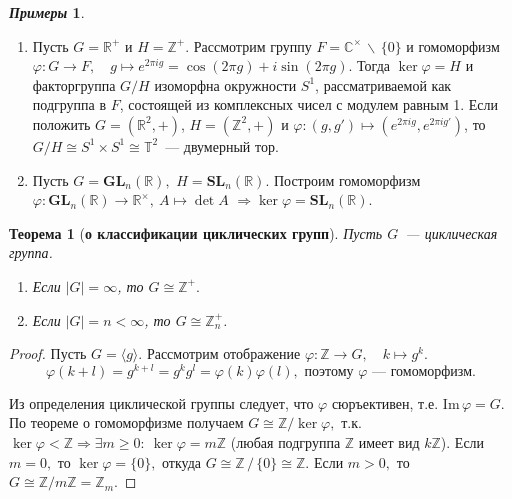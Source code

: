 \documentclass[a4paper, 14pt]{extarticle}
\newcommand{\n}{\par}
\newcommand{\integers}{\mathbb{Z}}
\newcommand{\real}{\mathbb{R}}
\newcommand{\complex}{\mathbb{C}}
\newcommand{\GL}{\mathbf{GL}}
\newcommand{\SL}{\mathbf{SL}}
\newcommand{\suchthat}{{:}{ } \ }
\newcommand{\im}{\mathrm{Im} \,}
\renewcommand{\phi}{\varphi}
\theoremstyle{definition}
\newtheorem*{exmpls}{\textit{Примеры}}
\theoremstyle{plain}
\newtheorem*{theorem*}{Теорема}
\numberwithin{theorem}{section}
\numberwithin{definition}{section}
\numberwithin{statement}{section}
\numberwithin{lemma}{section}
\numberwithin{consequence}{section}
\begin{document}
	\begin{exmpls}
        \
        \begin{enumerate}
            \setlength\itemsep{0.1em}
            \item Пусть ${G = \real ^ +}$ и ${H = \integers ^ +}$. Рассмотрим группу ${F = \complex^{\times} \, \backslash \, \{0\}}$ и гомоморфизм ${\phi: G \rightarrow F}, {\quad g \mapsto e^{2\pi i g} = \cos(2\pi g) + i \sin(2\pi g).}$
		Тогда ${\ker \phi = H}$ и факторгруппа $G/H$ изоморфна окружности $S^1$, рассматриваемой как подгруппа в $F$, состоящей из комплексных чисел с модулем равным 1. Если положить ${G = (\real^2, +)}$, ${H = (\integers^2, +)}$ и ${\phi : (g, g') \mapsto (e^{2\pi i g}, e^{2\pi i g'})}$, то ${G/H \cong S^1 \times S^1 \cong \mathbb{T}^2}$~--- двумерный тор.
            \item Пусть ${G = \GL_n(\real),}$ ${H = \SL_n(\real)}.$ Построим гомоморфизм ${\phi : \GL_n(\real) \rightarrow \real^{\times}, \ A \mapsto \det A}$ ${\Rightarrow \ker \phi = \SL_n(\real).}$
        \end{enumerate}
	\end{exmpls}
	\begin{theorem*}[\textbf{о классификации циклических групп}]
		Пусть $G$~--- циклическая группа.
		\begin{enumerate}
			\setlength\itemsep{0.1em}
			\item Если $|G| = \infty$, то $G \cong \integers ^ +.$
			\item Если $|G| = n < \infty$, то $G \cong \integers_n ^ +$.
		\end{enumerate}
	\end{theorem*}
	\begin{proof}
		Пусть ${G = \langle g \rangle.}$ Рассмотрим отображение $\phi: \integers \rightarrow G, \quad k \mapsto g^k.$
		\begin{equation*}
			\phi(k + l) = g^{k+l} = g^kg^l =
			\phi(k) \phi(l), \text{ поэтому } \phi \text{~--- гомоморфизм.}
		\end{equation*} \n
		Из определения циклической группы следует, что $\phi$ сюръективен, т.е. $\im \phi = G$. По теореме о гомоморфизме получаем ${G \cong \integers/\ker \phi,}$ т.к. ${\ker \phi < \integers \Longrightarrow \exists m \geqslant 0 \suchthat \ker \phi = m \integers}$ (любая подгруппа $\integers$ имеет вид $k\integers$). Если ${m = 0},$ то ${\ker \phi = \{0\},}$ откуда ${G \cong \integers \, / \, \{0\} \cong \integers.}$ Если ${m > 0,}$ то ${G \cong \integers/m\integers = \integers_m.}$
	\end{proof}
	\newpage
\end{document}
